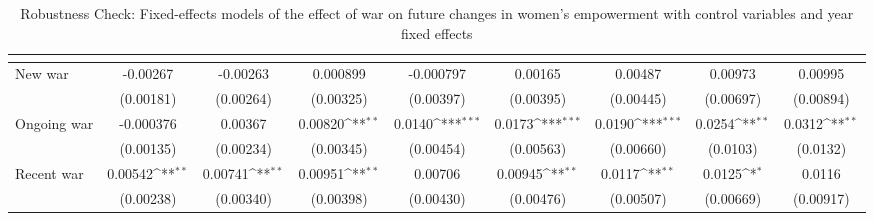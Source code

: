 \begin{table}[htbp]\centering
\def\sym#1{\ifmmode^{#1}\else\(^{#1}\)\fi}
\caption{Robustness Check: Fixed-effects models of the effect of war on future changes in women's empowerment with control variables and year fixed effects\label{polemprobustsimpyear}}
\begin{tabular}{l*{8}{c}}
\hline\hline
                    &&&&&&&&\\
\hline
New war              &    -0.00267         &    -0.00263         &    0.000899         &   -0.000797         &     0.00165         &     0.00487         &     0.00973         &     0.00995         \\
                    &   (0.00181)         &   (0.00264)         &   (0.00325)         &   (0.00397)         &   (0.00395)         &   (0.00445)         &   (0.00697)         &   (0.00894)         \\
[1em]
Ongoing war          &   -0.000376         &     0.00367         &     0.00820\sym{**} &      0.0140\sym{***}&      0.0173\sym{***}&      0.0190\sym{***}&      0.0254\sym{**} &      0.0312\sym{**} \\
                    &   (0.00135)         &   (0.00234)         &   (0.00345)         &   (0.00454)         &   (0.00563)         &   (0.00660)         &    (0.0103)         &    (0.0132)         \\
[1em]
Recent war             &     0.00542\sym{**} &     0.00741\sym{**} &     0.00951\sym{**} &     0.00706         &     0.00945\sym{**} &      0.0117\sym{**} &      0.0125\sym{*}  &      0.0116         \\
                    &   (0.00238)         &   (0.00340)         &   (0.00398)         &   (0.00430)         &   (0.00476)         &   (0.00507)         &   (0.00669)         &   (0.00917)         \\

\end{tabular}
\end{table}
